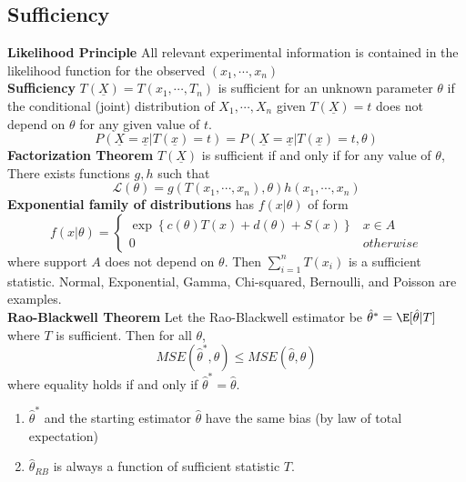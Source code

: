 \documentclass[8pt]{article}
\begin{document}
\begin{multicols}{3}
{   \subsection*{Sufficiency}
   \textbf{Likelihood Principle} All relevant experimental information is contained in the likelihood function for the observed $(x_1, \cdots, x_n)$\\
   \textbf{Sufficiency} $T(\underline{X}) = T(x_1, \cdots,T_n)$ is sufficient for an unknown parameter $\theta$ if the conditional (joint) distribution of $X_1, \cdots, X_n$ given $T(\underline{X}) = t$ does not depend on $\theta$ for any given value of $t$.
   \[
     P(\underline{X} = \underline{x}|T(\underline{x}) = t) = P(\underline{X} = \underline{x}|T(\underline{x}) = t, \theta)
   \]
   \textbf{Factorization Theorem}  $T(\underline{X})$ is sufficient if and only if for any value of $\theta$, There exists functions $g, h$ such that
   \[
     \mathcal{L}(\theta) = g(T(x_1, \cdots, x_n), \theta)h(x_1, \cdots, x_n)
   \]
   \textbf{Exponential family of distributions} has $f(x|\theta)$ of form
   \[
     f(x|\theta) =
     \begin{cases}
       \exp \left\{c(\theta) T(x) + d(\theta) + S(x)\right\} & x\in A\\
       0 & otherwise
     \end{cases}
   \]
   where support $A$ does not depend on $\theta$. Then $\sum_{i=1}^n T(x_i)$ is a sufficient statistic. Normal, Exponential, Gamma, Chi-squared, Bernoulli, and Poisson are examples.\\
   \textbf{Rao-Blackwell Theorem} Let the Rao-Blackwell estimator be $\hat{\theta}^* = \E[\hat{\theta} | T]$ where $T$ is sufficient. Then for all $\theta$,
   \[
     MSE(\hat{\theta}^*, \theta) \leq MSE(\hat{\theta}, \theta)
   \]
   where equality holds if and only if $\hat{\theta}^* = \hat{\theta}$.
   \begin{enumerate}
     \item $\hat{\theta}^*$ and the starting estimator $\hat{\theta}$ have the same bias (by law of total expectation)
     \item $\hat{\theta}_{RB}$ is always a function of sufficient statistic $T$.
   \end{enumerate}

}
\end{multicols}
\end{document}
